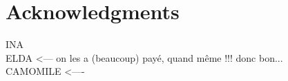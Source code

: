 \documentclass{acm_proc_article-me}
\begin{document}
\section{Acknowledgments}

INA \\
ELDA  <--- on les a (beaucoup) payé, quand même !!! donc bon... \\
CAMOMILE  <---- \\

\newpage


\end{document}
